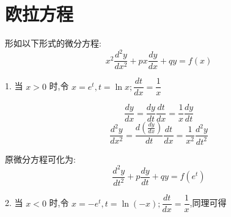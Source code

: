 \section{欧拉方程}
\begin{definition}[欧拉方程]\label{def: 欧拉方程}
	形如以下形式的微分方程:
	$$x^{2}\dfrac{d^{2}y}{dx^2}+px\dfrac{dy}{dx}+qy=f(x)$$

	1. 当 $x>0$ 时,令 $x=e^t,t=\ln x;\dfrac{dt}{dx}=\dfrac{1}{x}$

	$$\dfrac{dy}{dx}=\dfrac{dy}{dt}\dfrac{dt}{dx}=\dfrac{1}{x}\dfrac{dy}{dt}$$
	$$\dfrac{d^{2}y}{dx^2}=\dfrac{d(\frac{dy}{dx})}{dt}\dfrac{dt}{dx}=\dfrac{1}{x^2}\dfrac{d^{2}y}{dt^2}$$

	原微分方程可化为:
	$$\dfrac{d^{2}y}{dt^2}+p\dfrac{dy}{dt}+qy=f(e^t)$$

	2. 当 $x<0$ 时,令 $x=-e^t,t=\ln(-x);\dfrac{dt}{dx}=\dfrac{1}{x}$,同理可得
\end{definition}




